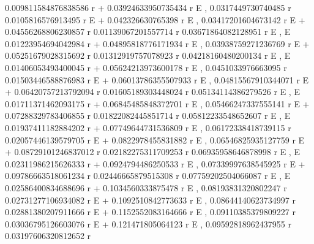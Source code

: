 \documentclass{article}
\begin{document}
                              0.009811584876838586 r
     + 0.03924633950735434 r E                      , 
     0.0317449730740485 r                        0.0105816576913495 r
    E                     + 0.042326630765398 r E                    , 
     0.03417201604673142 r
    E                      + 0.04556268806230857 r
      0.01139067201557714 r   0.03671864082128951 r
     E                     , E
                              0.01223954694042984 r
     + 0.04895818776171934 r E                     , 
     0.03938759271236769 r
    E                      + 0.05251679028315692 r
      0.01312919757078923 r   0.04218160480200134 r
     E                     , E
                              0.01406053493400045 r
     + 0.05624213973600178 r E                     , 
     0.0451033976663095 r                          0.01503446588876983 r
    E                     + 0.06013786355507933 r E                     , 
     0.04815567910344071 r
    E                      + 0.06420757213792094 r
      0.01605189303448024 r   0.05134114386279526 r
     E                     , E
                              0.01711371462093175 r
     + 0.06845485848372701 r E                     , 
     0.05466247337555141 r
    E                      + 0.07288329783406855 r
      0.01822082445851714 r   0.05812233548652607 r
     E                     , E
                              0.01937411182884202 r
     + 0.07749644731536809 r E                     , 
     0.06172338418739115 r                         0.02057446139579705 r
    E                      + 0.0822978455831882 r E                     , 
     0.06546825935127759 r
    E                      + 0.08729101246837012 r
      0.02182275311709253 r   0.06935958646878998 r
     E                     , E
                             0.02311986215626333 r
     + 0.0924794486250533 r E                     , 
     0.07339997638545925 r
    E                      + 0.09786663518061234 r
      0.02446665879515308 r   0.07759202504066087 r
     E                     , E
                             0.02586400834688696 r
     + 0.1034560333875478 r E                     , 
     0.08193831320802247 r                         0.02731277106934082 r
    E                      + 0.1092510842773633 r E                     , 
     0.08644140623734997 r                         0.02881380207911666 r
    E                      + 0.1152552083164666 r E                     , 
     0.09110385379809227 r                        0.03036795126603076 r
    E                      + 0.121471805064123 r E                     , 
     0.09592818962437955 r                         0.03197606320812652 r
\end{document}
